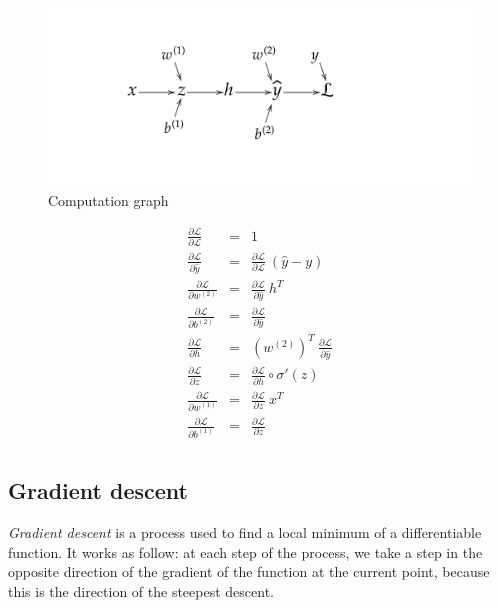 \documentclass[10pt,a4paper]{article}
\theoremstyle{definition}
\theoremstyle{definition}
\theoremstyle{definition}
\begin{document}
\begin{figure}
\center
\includegraphics[scale=0.3]{computation_graph.png}
\caption{Computation graph}
\end{figure}

\begin{eqnarray*}
\frac{\partial \mathcal{L}}{\partial \mathcal{L}} & = & 1 \\
\frac{\partial \mathcal{L}}{\partial \hat{y}} & = & \frac{\partial \mathcal{L}}{\partial \mathcal{L}} \ (\hat{y} - y) \\
\frac{\partial \mathcal{L}}{\partial w^{(2)}} & = & \frac{\partial \mathcal{L}}{\partial \hat{y}}\ h^T \\
\frac{\partial \mathcal{L}}{\partial b^{(2)}} & = & \frac{\partial \mathcal{L}}{\partial \hat{y}} \\
\frac{\partial \mathcal{L}}{\partial h} & = &  (w^{(2)})^T\ \frac{\partial \mathcal{L}}{\partial \hat{y}} \\
\frac{\partial \mathcal{L}}{\partial z} & = & \frac{\partial \mathcal{L}}{\partial h} \circ \sigma '(z) \\
\frac{\partial \mathcal{L}}{\partial w^{(1)}} & = & \frac{\partial \mathcal{L}}{\partial z}\ x^T \\
\frac{\partial \mathcal{L}}{\partial b^{(1)}} & = & \frac{\partial \mathcal{L}}{\partial z} \\
\end{eqnarray*}

\subsection{Gradient descent}

\textit{Gradient descent} is a process used to find a local minimum of a differentiable function. It works as follow: at each step of the process, we take a step in the opposite direction of the gradient of the function at the current point, because this is the direction of the steepest descent.
\end{document}
